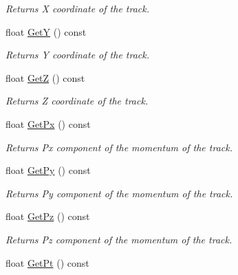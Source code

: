 \begin{DoxyCompactItemize}
\begin{DoxyCompactList}\small\item\em Returns X coordinate of the track. \end{DoxyCompactList}\item 
float \hyperlink{classKFPTrack_a49af0096efd8522003dff109ae3a15f0}{GetY} () const \hypertarget{classKFPTrack_a49af0096efd8522003dff109ae3a15f0}{}\label{classKFPTrack_a49af0096efd8522003dff109ae3a15f0}

\begin{DoxyCompactList}\small\item\em Returns Y coordinate of the track. \end{DoxyCompactList}\item 
float \hyperlink{classKFPTrack_a0291b116ad42cc695517a26d88b02621}{GetZ} () const \hypertarget{classKFPTrack_a0291b116ad42cc695517a26d88b02621}{}\label{classKFPTrack_a0291b116ad42cc695517a26d88b02621}

\begin{DoxyCompactList}\small\item\em Returns Z coordinate of the track. \end{DoxyCompactList}\item 
float \hyperlink{classKFPTrack_a2e24a47ade49d2e8a227374f4a443737}{Get\+Px} () const \hypertarget{classKFPTrack_a2e24a47ade49d2e8a227374f4a443737}{}\label{classKFPTrack_a2e24a47ade49d2e8a227374f4a443737}

\begin{DoxyCompactList}\small\item\em Returns Px component of the momentum of the track. \end{DoxyCompactList}\item 
float \hyperlink{classKFPTrack_a3b49837a7c04122f3b3b889dfa611a6a}{Get\+Py} () const \hypertarget{classKFPTrack_a3b49837a7c04122f3b3b889dfa611a6a}{}\label{classKFPTrack_a3b49837a7c04122f3b3b889dfa611a6a}

\begin{DoxyCompactList}\small\item\em Returns Py component of the momentum of the track. \end{DoxyCompactList}\item 
float \hyperlink{classKFPTrack_a5f711955ea21d5c26128f4992db253ad}{Get\+Pz} () const \hypertarget{classKFPTrack_a5f711955ea21d5c26128f4992db253ad}{}\label{classKFPTrack_a5f711955ea21d5c26128f4992db253ad}

\begin{DoxyCompactList}\small\item\em Returns Pz component of the momentum of the track. \end{DoxyCompactList}\item 
float \hyperlink{classKFPTrack_a65a744af280c0dc2356e3abbdbfbb2c3}{Get\+Pt} () const \hypertarget{classKFPTrack_a65a744af280c0dc2356e3abbdbfbb2c3}{}\label{classKFPTrack_a65a744af280c0dc2356e3abbdbfbb2c3}


\end{DoxyCompactItemize}
